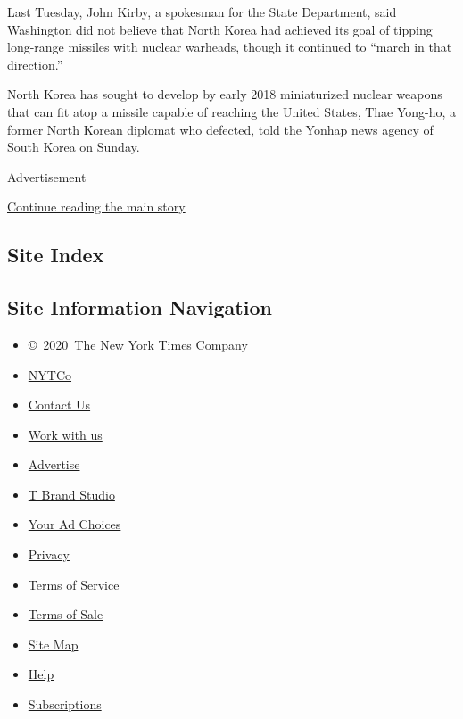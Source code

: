 Last Tuesday, John Kirby, a spokesman for the State Department, said
Washington did not believe that North Korea had achieved its goal of
tipping long-range missiles with nuclear warheads, though it continued
to ``march in that direction.''

North Korea has sought to develop by early 2018 miniaturized nuclear
weapons that can fit atop a missile capable of reaching the United
States, Thae Yong-ho, a former North Korean diplomat who defected, told
the Yonhap news agency of South Korea on Sunday.

Advertisement

\protect\hyperlink{after-bottom}{Continue reading the main story}

\hypertarget{site-index}{%
\subsection{Site Index}\label{site-index}}

\hypertarget{site-information-navigation}{%
\subsection{Site Information
Navigation}\label{site-information-navigation}}

\begin{itemize}
\tightlist
\item
  \href{https://help.nytimes3xbfgragh.onion/hc/en-us/articles/115014792127-Copyright-notice}{©~2020~The
  New York Times Company}
\end{itemize}

\begin{itemize}
\tightlist
\item
  \href{https://www.nytco.com/}{NYTCo}
\item
  \href{https://help.nytimes3xbfgragh.onion/hc/en-us/articles/115015385887-Contact-Us}{Contact
  Us}
\item
  \href{https://www.nytco.com/careers/}{Work with us}
\item
  \href{https://nytmediakit.com/}{Advertise}
\item
  \href{http://www.tbrandstudio.com/}{T Brand Studio}
\item
  \href{https://www.nytimes3xbfgragh.onion/privacy/cookie-policy\#how-do-i-manage-trackers}{Your
  Ad Choices}
\item
  \href{https://www.nytimes3xbfgragh.onion/privacy}{Privacy}
\item
  \href{https://help.nytimes3xbfgragh.onion/hc/en-us/articles/115014893428-Terms-of-service}{Terms
  of Service}
\item
  \href{https://help.nytimes3xbfgragh.onion/hc/en-us/articles/115014893968-Terms-of-sale}{Terms
  of Sale}
\item
  \href{https://spiderbites.nytimes3xbfgragh.onion}{Site Map}
\item
  \href{https://help.nytimes3xbfgragh.onion/hc/en-us}{Help}
\item
  \href{https://www.nytimes3xbfgragh.onion/subscription?campaignId=37WXW}{Subscriptions}
\end{itemize}
